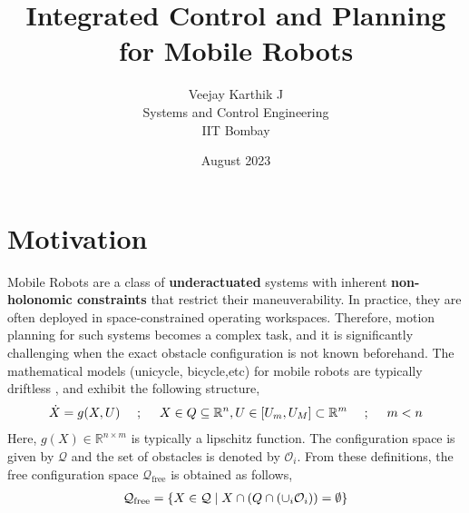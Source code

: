 \documentclass{article}
\begin{document}
    \title{Integrated Control and Planning for Mobile Robots}
    \author{Veejay Karthik J\\
    Systems and Control Engineering\\
    IIT Bombay}
    \date{August 2023}
    
    
    \maketitle
    
    \section{Motivation}
    
    Mobile Robots are a class of \textbf{underactuated} systems with inherent \textbf{non-holonomic constraints} that restrict their maneuverability. In practice, they are often deployed in space-constrained operating workspaces. Therefore, motion planning for such systems becomes a complex task, and it is significantly challenging when the exact obstacle configuration is not known beforehand. The mathematical models (unicycle, bicycle,etc) for mobile robots are typically driftless , and exhibit the following structure,
    \begin{align}
    \label{eqn:SystemDescription}
    \centering
    \dot{X} = g(X,U) \quad~;~\quad X \in Q \subseteq \mathbb{R}^n, U\in [U_m,U_M]\subset\mathbb{R}^m \quad~;~\quad m < n
    \end{align}
    Here, $g(X)\in \mathbb{R}^{n\times m}$ is typically a lipschitz function. The configuration space is given by $\mathcal{Q}$ and the set of obstacles is denoted by $\mathcal{O}_i$. From these definitions, the free configuration space $\mathcal{Q}_{\text{free}}$ is obtained as follows,
    \begin{align}
        \label{eqn:FreeWorkspaces}
        \centering
        \mathcal{Q}_{\text{free}} = \{X\in\mathcal{Q}\;|\; X\cap\left(Q\cap (\cup_i \mathcal{O}_i)\right) = \emptyset \}
    \end{align}
    
\end{document}
